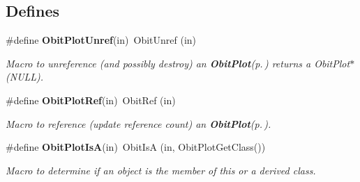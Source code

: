 \subsection*{Defines}
\begin{CompactItemize}
\item 
\#define {\bf Obit\-Plot\-Unref}(in)\ Obit\-Unref (in)
\begin{CompactList}\small\item\em Macro to unreference (and possibly destroy) an {\bf Obit\-Plot}{\rm (p.\,\pageref{structObitPlot})} returns a Obit\-Plot$\ast$ (NULL). \item\end{CompactList}\item 
\#define {\bf Obit\-Plot\-Ref}(in)\ Obit\-Ref (in)
\begin{CompactList}\small\item\em Macro to reference (update reference count) an {\bf Obit\-Plot}{\rm (p.\,\pageref{structObitPlot})}. \item\end{CompactList}\item 
\#define {\bf Obit\-Plot\-Is\-A}(in)\ Obit\-Is\-A (in, Obit\-Plot\-Get\-Class())
\begin{CompactList}\small\item\em Macro to determine if an object is the member of this or a derived class. \item\end{CompactList}\end{CompactItemize}
